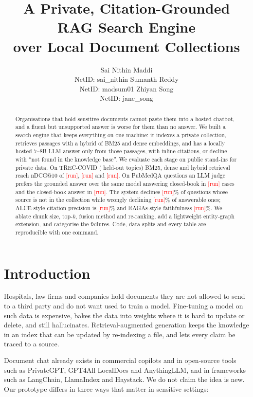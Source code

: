 \documentclass[11pt]{article}
\title{A Private, Citation-Grounded RAG Search Engine\\over Local Document Collections}
\author{Sai Nithin Maddi \\ NetID: sai\_nithin \And Sumanth Reddy \\ NetID: madsum01 \And Zhiyan Song \\ NetID: jane\_song}
\newcommand{\pending}{\textcolor{red}{[run]}}
\providecommand{\NdcgBm}{\pending}\providecommand{\NdcgDense}{\pending}\providecommand{\NdcgHybrid}{\pending}
\providecommand{\RagWins}{\pending}\providecommand{\CbWins}{\pending}\providecommand{\JudgeTies}{\pending}
\providecommand{\AbstainAcc}{\pending}\providecommand{\OverRefusal}{\pending}
\providecommand{\CitePrec}{\pending}\providecommand{\CiteRec}{\pending}\providecommand{\Faithfulness}{\pending}
\begin{document}
\maketitle

\begin{abstract}
Organisations that hold sensitive documents cannot paste them into a hosted chatbot, and a
fluent but unsupported answer is worse for them than no answer. We built a search engine that
keeps everything on one machine: it indexes a private collection, retrieves passages with a
hybrid of BM25 and dense embeddings, and has a locally hosted 7--8B LLM answer only from those
passages, with inline citations, or decline with ``not found in the knowledge base''.
We evaluate each stage on public stand-ins for private data. On TREC-COVID
(\TrecTest{} held-out topics) BM25, dense and hybrid retrieval reach nDCG@10 of \NdcgBm,
\NdcgDense{} and \NdcgHybrid. On \PubAnswerable{} PubMedQA questions an LLM judge prefers the
grounded answer over the same model answering closed-book in \RagWins{} cases and the
closed-book answer in \CbWins. The system declines \AbstainAcc\% of \PubOut{} questions whose
source is not in the collection while wrongly declining \OverRefusal\% of answerable ones;
ALCE-style citation precision is \CitePrec\% and RAGAs-style faithfulness \Faithfulness\%.
We ablate chunk size, top-$k$, fusion method and re-ranking, add a lightweight entity-graph
extension, and categorise the failures. Code, data splits and every table are reproducible
with one command.
\end{abstract}

\section{Introduction}

Hospitals, law firms and companies hold documents they are not allowed to send to a third
party and do not want used to train a model. Fine-tuning a model on such data is expensive,
bakes the data into weights where it is hard to update or delete, and still hallucinates.
Retrieval-augmented generation \citep{lewis2020rag} keeps the knowledge in an index that can
be updated by re-indexing a file, and lets every claim be traced to a source.

Document chat already exists in commercial copilots and in open-source tools such as
PrivateGPT, GPT4All LocalDocs and AnythingLLM, and in frameworks such as LangChain,
LlamaIndex and Haystack. We do not claim the idea is new. Our prototype differs in three
ways that matter in sensitive settings:
\end{document}
